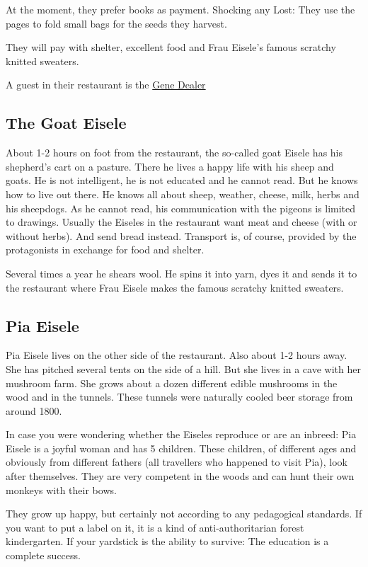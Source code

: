 At the moment, they prefer books as payment. Shocking any Lost: They use the pages to fold small bags for the seeds they harvest.

They will pay with shelter, excellent food and Frau Eisele's famous scratchy knitted sweaters.

A guest in their restaurant is the \hyperref[sec:Gene Dealer]{Gene Dealer}

\subsection{The Goat Eisele}

About 1-2 hours on foot from the restaurant, the so-called goat Eisele has his shepherd's cart on a pasture. There he lives a happy life with his sheep and goats.
He is not intelligent, he is not educated and he cannot read. But he knows how to live out there. He knows all about sheep, weather, cheese, milk, herbs and his sheepdogs.
As he cannot read, his communication with the pigeons is limited to drawings.
Usually the Eiseles in the restaurant want meat and cheese (with or without herbs). And send bread instead. Transport is, of course, provided by the protagonists in exchange for food and shelter.

Several times a year he shears wool. He spins it into yarn, dyes it and sends it to the restaurant where Frau Eisele makes the famous scratchy knitted sweaters.

\subsection{Pia Eisele}

Pia Eisele lives on the other side of the restaurant. Also about 1-2 hours away. She has pitched several tents on the side of a hill. But she lives in a cave with her mushroom farm. She grows about a dozen different edible mushrooms in the wood and in the tunnels.
These tunnels were naturally cooled beer storage from around 1800.

In case you were wondering whether the Eiseles reproduce or are an inbreed:
Pia Eisele is a joyful woman and has 5 children. These children, of different ages and obviously from different fathers (all travellers who happened to visit Pia), look after themselves. They are very competent in the woods and can hunt their own monkeys with their bows.

They grow up happy, but certainly not according to any pedagogical standards. If you want to put a label on it, it is a kind of anti-authoritarian forest kindergarten. If your yardstick is the ability to survive: The education is a complete success.

